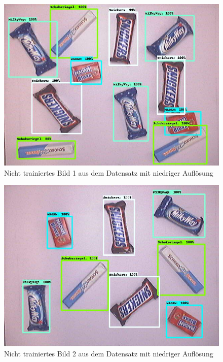     \begin{figure}[H]
        \centering
        \includegraphics[angle = 90, width = \textwidth]{Bilder/models/model_comparison/ssd_mobilenet_v1_fpn_640x640_coco17_tpu-8/non_trained_1.jpg}
        \caption{Nicht trainiertes Bild 1 aus dem Datensatz mit niedriger Auflösung}
    \end{figure}
    
    \begin{figure}[H]
        \centering
        \includegraphics[angle = 90, width = \textwidth]{Bilder/models/model_comparison/ssd_mobilenet_v1_fpn_640x640_coco17_tpu-8/non_trained_2.jpg}
        \caption{Nicht trainiertes Bild 2 aus dem Datensatz mit niedriger Auflösung}
    \end{figure}
    
